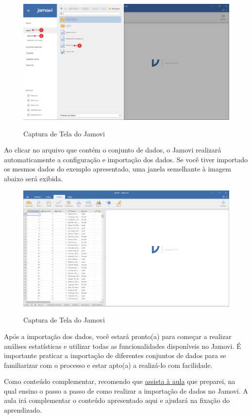 \begin{figure}[H]
  \centering
  \caption{Captura de Tela do Jamovi}
  \includegraphics[width=\textwidth]{imagens/cap_1/importa_dados_2.png}
  \label{fig:importa_dados_2}
\end{figure}

Ao clicar no arquivo que contém o conjunto de dados, o Jamovi realizará automaticamente a configuração e importação dos dados. Se você tiver importado os mesmos dados do exemplo apresentado, uma janela semelhante à imagem abaixo será exibida.

\begin{figure}[H]
  \centering
  \caption{Captura de Tela do Jamovi}
  \includegraphics[width=\textwidth]{imagens/cap_1/jamovi_arquivo_importado.png}
  \label{fig:jamovi_arquivo_importado}
\end{figure}

Após a importação dos dados, você estará pronto(a) para começar a realizar análises estatísticas e utilizar todas as funcionalidades disponíveis no Jamovi. É importante praticar a importação de diferentes conjuntos de dados para se familiarizar com o processo e estar apto(a) a realizá-lo com facilidade.

Como conteúdo complementar, recomendo que \href{https://www.youtube.com/watch?v=NIpt0wIq5pc}{assista à aula} que preparei, na qual ensino o passo a passo de como realizar a importação de dados no Jamovi. A aula irá complementar o conteúdo apresentado aqui e ajudará na fixação do aprendizado.